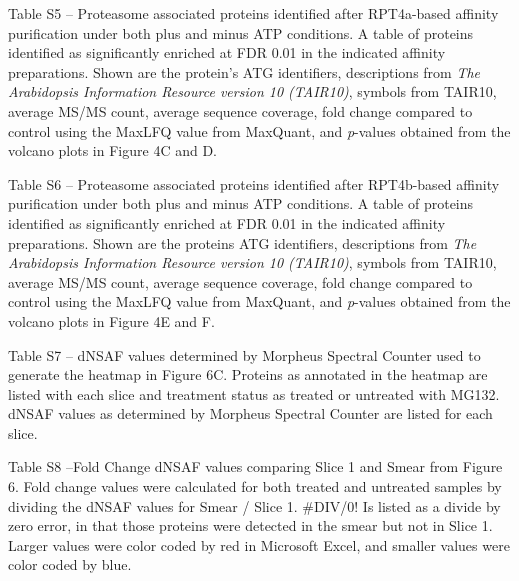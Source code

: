 Table S5 – Proteasome associated proteins identified after RPT4a-based affinity purification under both plus and minus ATP conditions. A table of proteins identified as significantly enriched at FDR 0.01 in the indicated affinity preparations.  Shown are the protein’s ATG identifiers, descriptions from \textit{The Arabidopsis Information Resource version 10 (TAIR10)}, symbols from TAIR10, average MS/MS count, average sequence coverage, fold change compared to control using the MaxLFQ value from MaxQuant, and \textit{p}-values obtained from the volcano plots in Figure 4C and D.

Table S6 – Proteasome associated proteins identified after RPT4b-based affinity purification under both plus and minus ATP conditions. A table of proteins identified as significantly enriched at FDR 0.01 in the indicated affinity preparations.  Shown are the proteins ATG identifiers, descriptions from \textit{The Arabidopsis Information Resource version 10 (TAIR10)}, symbols from TAIR10, average MS/MS count, average sequence coverage, fold change compared to control using the MaxLFQ value from MaxQuant, and \textit{p}-values obtained from the volcano plots in Figure 4E and F.

Table S7 – dNSAF values determined by Morpheus Spectral Counter used to generate the heatmap in Figure 6C. Proteins as annotated in the heatmap are listed with each slice and treatment status as treated or untreated with MG132. dNSAF values as determined by Morpheus Spectral Counter \citep{gemperline16} are listed for each slice.

Table S8 –Fold Change dNSAF values comparing Slice 1 and Smear from Figure 6. Fold change values were calculated for both treated and untreated samples by dividing the dNSAF values for Smear / Slice 1. \#DIV/0! Is listed as a divide by zero error, in that those proteins were detected in the smear but not in Slice 1. Larger values were color coded by red in Microsoft Excel, and smaller values were color coded by blue.
